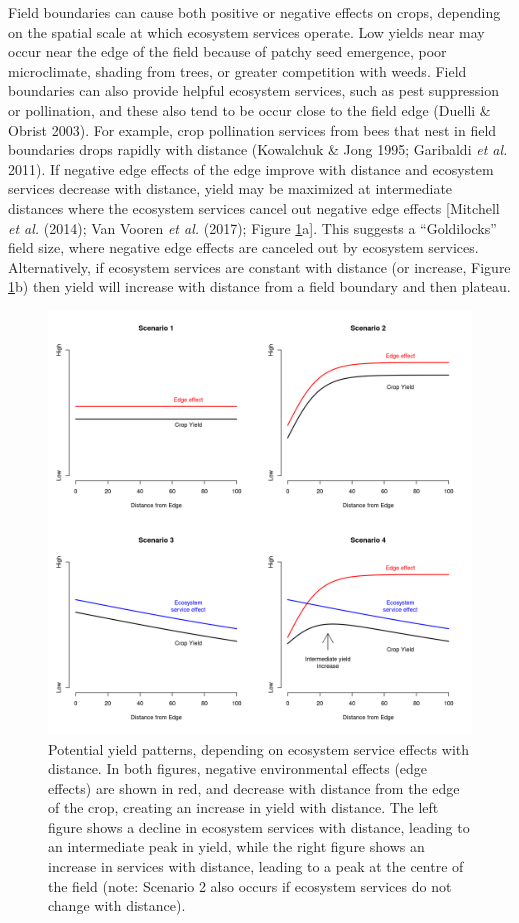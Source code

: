\documentclass[]{elsarticle} %
\begin{document}
Field boundaries can cause both positive or negative effects on crops, depending on the spatial scale at which ecosystem services operate.
Low yields near may occur near the edge of the field because of patchy seed emergence, poor microclimate, shading from trees, or greater competition with weeds.
Field boundaries can also provide helpful ecosystem services, such as pest suppression or pollination, and these also tend to be occur close to the field edge (Duelli \& Obrist 2003).
For example, crop pollination services from bees that nest in field boundaries drops rapidly with distance (Kowalchuk \& Jong 1995; Garibaldi \emph{et al.} 2011).
If negative edge effects of the edge improve with distance and ecosystem services decrease with distance, yield may be maximized at intermediate distances where the ecosystem services cancel out negative edge effects {[}Mitchell \emph{et al.} (2014); Van Vooren \emph{et al.} (2017); Figure \ref{fig:hypotheses}a{]}.
This suggests a ``Goldilocks'' field size, where negative edge effects are canceled out by ecosystem services.
Alternatively, if ecosystem services are constant with distance (or increase, Figure \ref{fig:hypotheses}b) then yield will increase with distance from a field boundary and then plateau.

\begin{figure}
\includegraphics[width=1\linewidth]{../Figures/ExamplePlots/hypotheses} \caption{Potential yield patterns, depending on ecosystem service effects with distance. In both figures, negative environmental effects (edge effects) are shown in red, and decrease with distance from the edge of the crop, creating an increase in yield with distance. The left figure shows a decline in ecosystem services with distance, leading to an intermediate peak in yield, while the right figure shows an increase in services with distance, leading to a peak at the centre of the field (note: Scenario 2 also occurs if ecosystem services do not change with distance).}\label{fig:hypotheses}
\end{figure}
\end{document}
